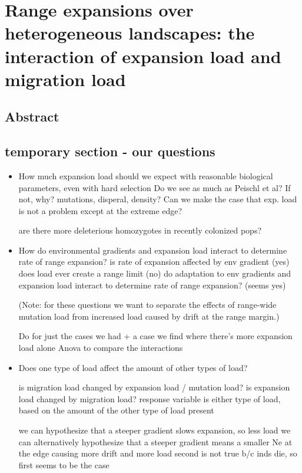 \chapter{Range expansions over heterogeneous landscapes: the interaction of expansion load and migration load}%
\label{chap:expansionload}

\section{Abstract}

\section{temporary section - our questions}

\begin{itemize}

\item How much expansion load should we expect with reasonable biological parameters, even with hard selection
Do we see as much as Peischl et al? If not, why? mutations, disperal, density?
Can we make the case that exp. load is not a problem except at the extreme edge?

are there more deleterious homozygotes in recently colonized pops?

\item How do environmental gradients and expansion load interact to determine rate of range expansion?
is rate of expansion affected by env gradient (yes)
does load ever create a range limit (no)
do adaptation to env gradients and expansion load interact to determine rate of range expansion? (seems yes)

(Note:  for these questions we want to separate the effects of range-wide mutation load from increased load 
caused by drift at the range margin.)

Do for just the cases we had + a case we find where there’s more expansion load alone
	Anova to compare the interactions
	
\item Does one type of load affect the amount of other types of load?

is migration load changed by expansion load / mutation load?
is expansion load changed by migration load?
	response variable is either type of load, based on the amount of the other type of load present
	
we can hypothesize that a steeper gradient slows expansion, so less load
we can alternatively hypothesize that a steeper gradient means a smaller Ne at the edge causing more drift and more load
	second is not true b/c inds die, so first seems to be the case
	

\end{itemize}
